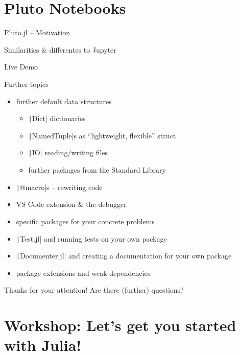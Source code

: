 \documentclass[aspectratio=169, 12pt]{beamer}
\begin{document}
    \section{Pluto Notebooks}
    \begin{frame}{Pluto.jl – Motivation}
    \end{frame}
    \begin{frame}{Similarities \& differentes to Jupyter}
    \end{frame}
    \begin{frame}{Live Demo}
    \end{frame}
    \begin{frame}{Further topics}
        \begin{itemize}
            \item further default data structures
            \begin{itemize}
                \item \texttt|Dict| dictionaries
                \item \texttt|NamedTuple|s as “lightweight, flexible” struct
                \item \texttt|IO| reading/writing files
                \item further packages from the Standard Library
            \end{itemize}
            \item \texttt|@macro|s – rewriting code
            \item VS Code extension \& the debugger
            \item specific packages for your concrete problems
            \item \texttt|Test.jl| and running tests on your own package
            \item \texttt|Documenter.jl| and creating a documentation for your own package
            \item \alert{package extensions} and weak dependencies
        \end{itemize}
    \end{frame}
    \begin{frame}{Thanks for your attention!}
        Are there (further) questions?
    \end{frame}
    \section{Workshop: Let's get you started with Julia!}
\end{document}
